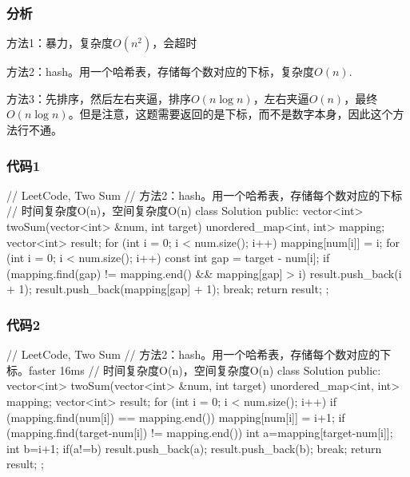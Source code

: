 \subsubsection{分析}
方法1：暴力，复杂度$O(n^2)$，会超时

方法2：hash。用一个哈希表，存储每个数对应的下标，复杂度$O(n)$.

方法3：先排序，然后左右夹逼，排序$O(n\log n)$，左右夹逼$O(n)$，最终$O(n\log n)$。但是注意，这题需要返回的是下标，而不是数字本身，因此这个方法行不通。


\subsubsection{代码1}
\begin{Code}
// LeetCode, Two Sum
// 方法2：hash。用一个哈希表，存储每个数对应的下标
// 时间复杂度O(n)，空间复杂度O(n)
class Solution {
public:
    vector<int> twoSum(vector<int> &num, int target) {
        unordered_map<int, int> mapping;
        vector<int> result;
        for (int i = 0; i < num.size(); i++) {
            mapping[num[i]] = i;
        }
        for (int i = 0; i < num.size(); i++) {
            const int gap = target - num[i];
            if (mapping.find(gap) != mapping.end() && mapping[gap] > i) {
                result.push_back(i + 1);
                result.push_back(mapping[gap] + 1);
                break;
            }
        }
        return result;
    }
};
\end{Code}


\subsubsection{代码2}
\begin{Code}
// LeetCode, Two Sum
// 方法2：hash。用一个哈希表，存储每个数对应的下标。faster 16ms
// 时间复杂度O(n)，空间复杂度O(n)
class Solution {
public:
    vector<int> twoSum(vector<int> &num, int target) {
        unordered_map<int, int> mapping;
        vector<int> result;
        for (int i = 0; i < num.size(); i++) {
            if (mapping.find(num[i]) == mapping.end()) mapping[num[i]] = i+1;
            if (mapping.find(target-num[i]) != mapping.end()) {
                int a=mapping[target-num[i]];
                int b=i+1;
                if(a!=b){
                    result.push_back(a);
                    result.push_back(b);
                    break;
                }
            }
        }
        return result;
    }
};
\end{Code}


